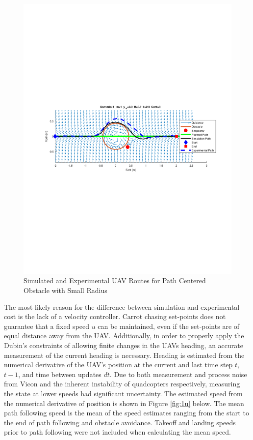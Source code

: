 \documentclass[numbered,pdftex]{ohio-etd}
\begin{document}
\begin{figure}[H]
	\centering
	\includegraphics[trim = 50 300 0 285, clip, width=16.5cm]{Figures/results/compareFigures/1Quiver}
	\caption{Simulated and Experimental UAV Routes for Path Centered Obstacle with Small Radius}
	\label{fig:1Quiver}
\end{figure}

The most likely reason for the difference between simulation and experimental cost is the lack of a velocity controller. Carrot chasing set-points does not guarantee that a fixed speed $u$ can be maintained, even if the set-points are of equal distance away from the UAV. Additionally, in order to properly apply the Dubin's constraints of allowing finite changes in the UAVs heading, an accurate measurement of the current heading is necessary. Heading is estimated from the numerical derivative of the UAV's position at the current and last time step $t$, $t-1$, and time between updates $dt$. Due to both measurement and process noise from Vicon and the inherent instability of quadcopters respectively, measuring the state at lower speeds had significant uncertainty. The estimated speed from the numerical derivative of position is shown in Figure \ref{fig:1u} below. The mean path following speed is the mean of the speed estimates ranging from the start to the end of path following and obstacle avoidance. Takeoff and landing speeds prior to path following were not included when calculating the  mean speed. 
\end{document}

